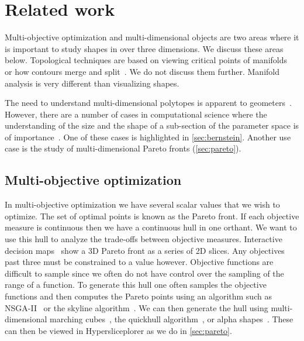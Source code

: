 \section{Related work}
\label{sec:related-work}

Multi-objective optimization and multi-dimensional objects are two areas
where it is important to study shapes in over three dimensions. We discuss 
these areas below. Topological techniques are based on viewing critical points
of manifolds~\cite{Correa:2011,Gerber:2010} or how contours merge and 
split~\cite{Carr:2003a}. We do not discuss them further. Manifold analysis
is very different than visualizing shapes. 

The need to understand multi-dimensional polytopes is apparent to 
geometers~\cite{Ziegler:2012}.
However, there are a number of cases in computational science where the
understanding of the size and the shape of a sub-section of the parameter space
is of importance~\cite{Bergner:2013,Sedlmair:2014}. One of these cases is
highlighted in \autoref{sec:bernstein}. Another use case is the study
of multi-dimensional Pareto fronts (\autoref{sec:pareto}).

\subsection{Multi-objective optimization}

In multi-objective optimization we have several scalar values that we wish to
optimize. The set of optimal points is known as the Pareto front.
If each objective measure is continuous then we have a continuous hull in one
orthant. We want to use this hull to analyze the trade-offs between objective
measures. Interactive decision maps~\cite{Lotov:2004} show a 3D Pareto front as
a series of 2D slices. Any objectives past three must be constrained to a value
however. Objective functions are difficult to sample since we often do
not have control over the sampling of the range of a function.  To
generate this hull one often samples the objective functions and then computes
the Pareto points using an algorithm such as NSGA-II~\cite{Deb:2002} or the
skyline algorithm~\cite{Borzsony:2001}. We can then generate the hull using
multi-dimensional marching cubes~\cite{Bhaniramka:2000}, the quickhull
algorithm~\cite{Barber:1996}, or alpha shapes~\cite{Edelsbrunner:1983}. These
can then be viewed in Hypersliceplorer as we do in \autoref{sec:pareto}.

